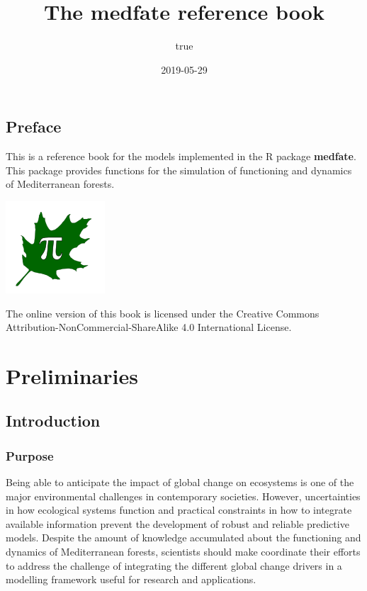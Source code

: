 \documentclass[]{book}
\title{The medfate reference book}
\author{true}
\date{2019-05-29}
\begin{document}
\maketitle

{
\setcounter{tocdepth}{1}
\tableofcontents
}
\hypertarget{preface}{%
\chapter*{Preface}\label{preface}}

This is a reference book for the models implemented in the R package \textbf{medfate}. This package provides functions for the simulation of functioning and dynamics of Mediterranean forests.

\begin{center}\includegraphics[width=0.2\linewidth]{LOGO_Group} \end{center}

The online version of this book is licensed under the Creative Commons Attribution-NonCommercial-ShareAlike 4.0 International License.

\hypertarget{part-preliminaries}{%
\part{Preliminaries}\label{part-preliminaries}}

\hypertarget{intro}{%
\chapter{Introduction}\label{intro}}

\hypertarget{purpose}{%
\section{Purpose}\label{purpose}}

Being able to anticipate the impact of global change on ecosystems is one of the major environmental challenges in contemporary societies. However, uncertainties in how ecological systems function and practical constraints in how to integrate available information prevent the development of robust and reliable predictive models. Despite the amount of knowledge accumulated about the functioning and dynamics of Mediterranean forests, scientists should make coordinate their efforts to address the challenge of integrating the different global change drivers in a modelling framework useful for research and applications.
\end{document}

